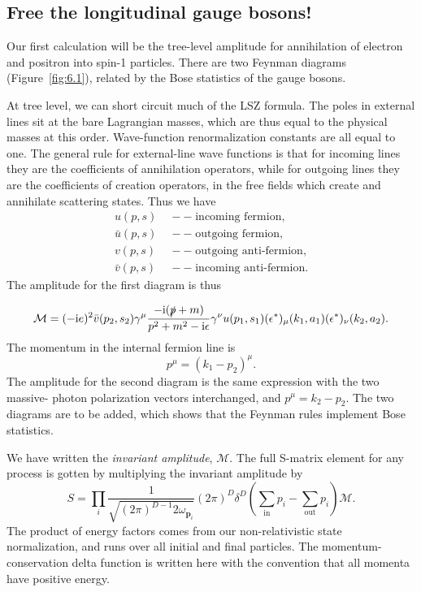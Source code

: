 \subsection{Free the longitudinal gauge bosons!}

Our first calculation will be the tree-level amplitude for annihilation of electron and
positron into spin-1 particles. There are two Feynman diagrams
(Figure~\ref{fig:6.1}), related
by the Bose statistics of the gauge bosons.

At tree level, we can short circuit much of the LSZ formula. The poles in external
lines sit at the bare Lagrangian masses, which are thus equal to the physical masses at
this order. Wave-function renormalization constants are all equal to one. The general
rule for external-line wave functions is that for incoming lines they are the coefficients
of annihilation operators, while for outgoing lines they are the coefficients of creation
operators, in the free fields which create and annihilate scattering states. Thus we have
\begin{equation*}
  \begin{aligned}
    u(p,s)&\;--\;\text{incoming fermion},\\
    \bar u(p,s)&\;--\;\text{outgoing fermion},\\
    v(p,s)&\;--\;\text{outgoing anti-fermion},\\
    \bar v(p,s)&\;--\;\text{incoming anti-fermion}.
  \end{aligned}
\end{equation*}
The amplitude for the first diagram is thus

\begin{equation}
  \mathcal{M}=(-\mathrm{i} e)^2\bar v(p_2,s_2)\gamma^\mu
    \frac{-\mathrm{i}(\slashed p+m)}{p^2+m^2-\mathrm{i}\epsilon}\gamma^\nu u(p_1,s_1)
  (\epsilon^*)_\mu(k_1,a_1)(\epsilon^*)_\nu(k_2,a_2).
  \label{eq:6.4}
\end{equation}
The momentum in the internal fermion line is
\begin{equation*}
  p^\mu=(k_1-p_2)^\mu.
\end{equation*}
The amplitude for the second diagram is the same expression with the two massive-
photon polarization vectors interchanged, and $p^\mu=k_2-p_2$. The two diagrams are to
be added, which shows that the Feynman rules implement Bose statistics.

We have written the \emph{invariant amplitude}, $\mathcal{M}$. The full S-matrix element for any process
is gotten by multiplying the invariant amplitude by
\begin{equation*}
  S=\prod_i\frac{1}{\sqrt{(2\pi)^{D-1} 2\omega_{\mathbf p_i}}}(2\pi)^D\delta^D
  \left(\sum_{\mathrm{in}}p_i-\sum_{\mathrm{out}}p_i\right)\mathcal{M}.
\end{equation*}
The product of energy factors comes from our non-relativistic state normalization, and
runs over all initial and final particles. The momentum-conservation delta function is
written here with the convention that all momenta have positive energy.

